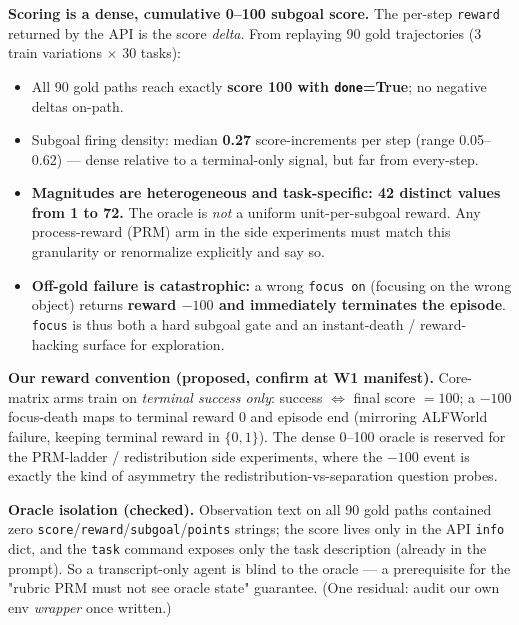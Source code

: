 \documentclass[10pt]{article}
\newcommand{\cmd}[1]{\texttt{\small #1}}
\begin{document}
\smallskip
\noindent\textbf{Scoring is a dense, cumulative 0--100 subgoal score.} The per-step \texttt{reward}
returned by the API is the score \emph{delta}. From replaying 90 gold trajectories (3 train variations
$\times$ 30 tasks):
\begin{itemize}
\item All 90 gold paths reach exactly \textbf{score 100 with \texttt{done}=True}; no negative deltas on-path.
\item Subgoal firing density: median \textbf{0.27} score-increments per step (range 0.05--0.62) --- dense
relative to a terminal-only signal, but far from every-step.
\item \textbf{Magnitudes are heterogeneous and task-specific: 42 distinct values from 1 to 72.} The oracle
is \emph{not} a uniform unit-per-subgoal reward. Any process-reward (PRM) arm in the side experiments must
match this granularity or renormalize explicitly and say so.
\item \textbf{Off-gold failure is catastrophic:} a wrong \cmd{focus on} (focusing on the wrong object)
returns \textbf{reward $-100$ and immediately terminates the episode}. \cmd{focus} is thus both a hard
subgoal gate and an instant-death / reward-hacking surface for exploration.
\end{itemize}

\noindent\textbf{Our reward convention (proposed, confirm at W1 manifest).} Core-matrix arms train on
\emph{terminal success only}: success $\Leftrightarrow$ final score $=100$; a $-100$ focus-death maps to
terminal reward $0$ and episode end (mirroring ALFWorld failure, keeping terminal reward in $\{0,1\}$).
The dense 0--100 oracle is reserved for the PRM-ladder / redistribution side experiments, where the $-100$
event is exactly the kind of asymmetry the redistribution-vs-separation question probes.

\smallskip
\noindent\textbf{Oracle isolation (checked).} Observation text on all 90 gold paths contained zero
\cmd{score}/\cmd{reward}/\cmd{subgoal}/\cmd{points} strings; the score lives only in the API \texttt{info}
dict, and the \cmd{task} command exposes only the task description (already in the prompt). So a
transcript-only agent is blind to the oracle --- a prerequisite for the "rubric PRM must not see oracle
state" guarantee. (One residual: audit our own env \emph{wrapper} once written.)
\end{document}
